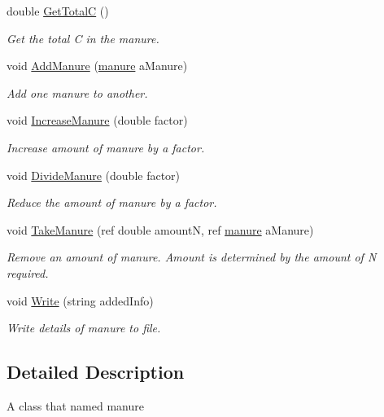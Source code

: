 \begin{DoxyCompactItemize}
double \mbox{\hyperlink{classmanure_aa6535fb2bef7c1d0b4462e61bb699718}{Get\+TotalC}} ()
\begin{DoxyCompactList}\small\item\em Get the total C in the manure. \end{DoxyCompactList}\item 
void \mbox{\hyperlink{classmanure_aa00f0ac2446502ded3b6c942bbff6c5b}{Add\+Manure}} (\mbox{\hyperlink{classmanure}{manure}} a\+Manure)
\begin{DoxyCompactList}\small\item\em Add one manure to another. \end{DoxyCompactList}\item 
void \mbox{\hyperlink{classmanure_a1410845b6c2f5815fde0170a3af74f6c}{Increase\+Manure}} (double factor)
\begin{DoxyCompactList}\small\item\em Increase amount of manure by a factor. \end{DoxyCompactList}\item 
void \mbox{\hyperlink{classmanure_ab44901c621d6bafa193cb5e60dc18c2b}{Divide\+Manure}} (double factor)
\begin{DoxyCompactList}\small\item\em Reduce the amount of manure by a factor. \end{DoxyCompactList}\item 
void \mbox{\hyperlink{classmanure_a0343f18d1a91ea0e5ba040a3c8d98e15}{Take\+Manure}} (ref double amountN, ref \mbox{\hyperlink{classmanure}{manure}} a\+Manure)
\begin{DoxyCompactList}\small\item\em Remove an amount of manure. Amount is determined by the amount of N required. \end{DoxyCompactList}\item 
void \mbox{\hyperlink{classmanure_a4410908e8e38c56c60ecffd7ee3eeb9a}{Write}} (string added\+Info)
\begin{DoxyCompactList}\small\item\em Write details of manure to file. \end{DoxyCompactList}\end{DoxyCompactItemize}


\subsection{Detailed Description}
A class that named manure 

